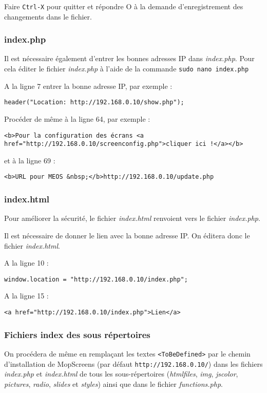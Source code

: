 \documentclass[a4paper]{ffco-rapport}
\begin{document}
		Faire \verb|Ctrl-X| pour quitter et répondre O à la demande d'enregistrement des changements dans le fichier.
		
		\subsubsection{index.php}
		Il est nécessaire également d'entrer les bonnes adresses IP dans \emph{index.php}. Pour cela éditer le fichier \emph{index.php} à l'aide de la commande \verb|sudo nano index.php|
		
		A la ligne 7 entrer la bonne adresse IP, par exemple :
		
		\verb|header("Location: http://192.168.0.10/show.php");|

		Procéder de même à la ligne 64, par exemple :
		
		\scriptsize
		\verb|<b>Pour la configuration des écrans <a href="http://192.168.0.10/screenconfig.php">cliquer ici !</a></b>|
		\normalsize
		
		et à la ligne 69 :
		
		\verb|<b>URL pour MEOS &nbsp;</b>http://192.168.0.10/update.php|
		
		\subsubsection{index.html}
		Pour améliorer la sécurité, le fichier \emph{index.html} renvoient vers le fichier \emph{index.php}.
		
		Il est nécessaire de donner le lien avec la bonne adresse IP. On éditera donc le fichier \emph{index.html}.
		
		A la ligne 10 :
		
		\verb|window.location = "http://192.168.0.10/index.php";|
		
		A la ligne 15 :
		
		\verb|<a href="http://192.168.0.10/index.php">Lien</a>|
		
		\subsubsection{Fichiers index des sous répertoires}
		
		On procédera de même en remplaçant les textes \verb|<ToBeDefined>| par le chemin d'installation de MopScreens (par défaut \verb|http://192.168.0.10/|) dans les fichiers \emph{index.php} et \emph{index.html} de tous les sous-répertoires (\emph{htmlfiles}, \emph{img}, \emph{jscolor}, \emph{pictures},  \emph{radio}, \emph{slides} et \emph{styles}) ainsi que dans le fichier \emph{functions.php}.
		
\end{document}
